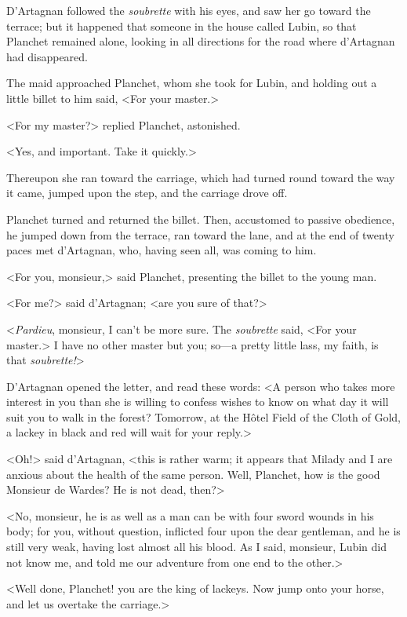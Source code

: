D'Artagnan followed the \textit{soubrette} with his eyes, and saw her go toward the terrace; but it happened that someone in the house called Lubin, so that Planchet remained alone, looking in all directions for the road where d'Artagnan had disappeared. 

The maid approached Planchet, whom she took for Lubin, and holding out a little billet to him said, <For your master.> 

<For my master?> replied Planchet, astonished. 

<Yes, and important. Take it quickly.> 

Thereupon she ran toward the carriage, which had turned round toward the way it came, jumped upon the step, and the carriage drove off. 

Planchet turned and returned the billet. Then, accustomed to passive obedience, he jumped down from the terrace, ran toward the lane, and at the end of twenty paces met d'Artagnan, who, having seen all, was coming to him. 

<For you, monsieur,> said Planchet, presenting the billet to the young man. 

<For me?> said d'Artagnan; <are you sure of that?> 

<\textit{Pardieu}, monsieur, I can't be more sure. The \textit{soubrette} said, <For your master.> I have no other master but you; so---a pretty little lass, my faith, is that \textit{soubrette!}> 

D'Artagnan opened the letter, and read these words: <A person who takes more interest in you than she is willing to confess wishes to know on what day it will suit you to walk in the forest? Tomorrow, at the Hôtel Field of the Cloth of Gold, a lackey in black and red will wait for your reply.> 

<Oh!> said d'Artagnan, <this is rather warm; it appears that Milady and I are anxious about the health of the same person. Well, Planchet, how is the good Monsieur de Wardes? He is not dead, then?> 

<No, monsieur, he is as well as a man can be with four sword wounds in his body; for you, without question, inflicted four upon the dear gentleman, and he is still very weak, having lost almost all his blood. As I said, monsieur, Lubin did not know me, and told me our adventure from one end to the other.> 

<Well done, Planchet! you are the king of lackeys. Now jump onto your horse, and let us overtake the carriage.> 

